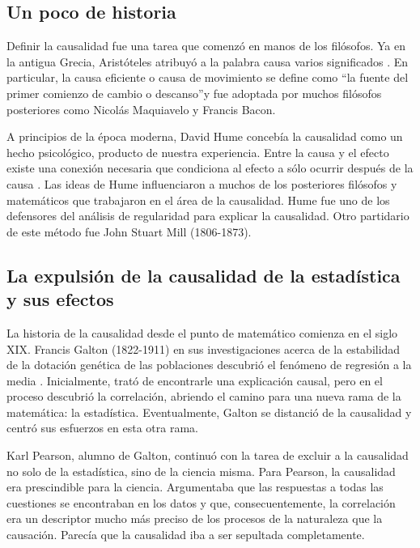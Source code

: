 \begin{introduction}
	\section{Un poco de historia}
	Definir la causalidad fue una tarea que comenzó en manos de los filósofos. Ya en la antigua Grecia, Aristóteles atribuyó a la palabra causa varios significados \cite{aristotle19331045a}. En particular, la causa eficiente o causa de movimiento se define como  \textquotedblleft la fuente del primer comienzo de cambio o descanso\textquotedblright y fue adoptada por muchos filósofos posteriores como Nicolás Maquiavelo y Francis Bacon.
	
	A principios de la época moderna, David Hume concebía la causalidad como un hecho psicológico, producto de nuestra experiencia. Entre la causa y el efecto existe una conexión necesaria que condiciona al efecto a sólo ocurrir después de la causa \cite{hume1896treatise}. Las ideas de Hume influenciaron a muchos de los posteriores filósofos y matemáticos que trabajaron en el área de la causalidad. Hume fue uno de los defensores del análisis de regularidad para explicar la causalidad. Otro partidario de este método fue John Stuart Mill (1806-1873).
	
	\subsection{La expulsión de la causalidad de la estadística y sus efectos}
	
	La historia de la causalidad desde el punto de matemático comienza en el siglo XIX. Francis Galton (1822-1911) en sus investigaciones acerca de la estabilidad de la dotación genética de las poblaciones descubrió el fenómeno de regresión a la media \cite{galton1886regression}. Inicialmente, trató de encontrarle una explicación causal, pero en el proceso descubrió la correlación, abriendo el camino para una nueva rama de la matemática: la estadística. Eventualmente, Galton se distanció de la causalidad y centró sus esfuerzos en esta otra rama.
	
	Karl Pearson, alumno de Galton, continuó con la tarea de excluir a la causalidad no solo de la estadística, sino de la ciencia misma. Para Pearson, la causalidad era prescindible para la ciencia. Argumentaba que las respuestas a todas las cuestiones se encontraban en los datos y que, consecuentemente, la correlación era un descriptor mucho más preciso de los procesos de la naturaleza que la causación. Parecía que la causalidad iba a ser sepultada completamente.
	

\end{introduction}
